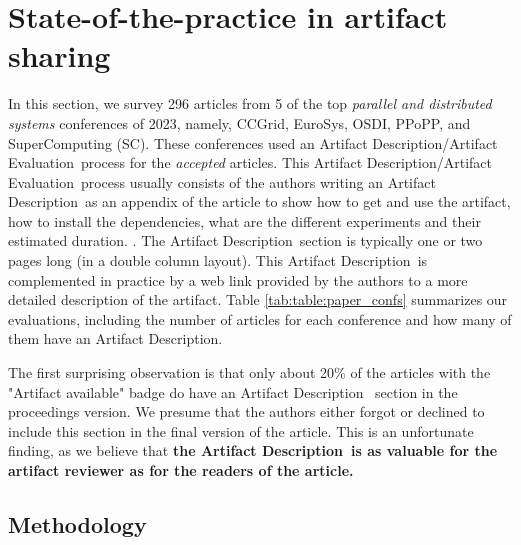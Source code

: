 \documentclass[sigconf,natbib=false]{acmart}
\newcommand{\ad}{Artifact Description}
\newcommand{\aeval}{Artifact Evaluation}
\newcommand{\adae}{\ad/\aeval}
\newcommand{\todo}[1]{{\color{red}{TODO: #1}}}
\begin{document}
%
\section{State-of-the-practice in artifact sharing}\label{sec:sop}



In this section, we survey 296 articles from 5 of the top \emph{parallel and distributed systems} conferences of 2023, namely, CCGrid, EuroSys, OSDI, PPoPP, and SuperComputing (SC).
These conferences used an \adae\ process for the \emph{accepted} articles.
This \adae\ process usually consists of the authors writing an \ad\ as an appendix of the article to show how to get and use the artifact, how to install the dependencies, what are the different experiments and their estimated duration. \cite{ae_tip, creating_successful_artifacts, ae_guidelines}.
The \ad\ section is typically one or two pages long (in a double column layout).
This \ad\ is complemented in practice by a web link provided by the authors to a more detailed description of the artifact.
Table \ref{tab:table:paper_confs} summarizes our evaluations, including the number of articles for each conference and how many of them have an \ad.


The first surprising observation is that only about 20\% of the articles with the "Artifact available" badge do have an \ad~ section in the proceedings version.
We presume that the authors either forgot or declined to include this section in the final version of the article.
This is an unfortunate finding, as we believe that \textbf{the \ad\ is as valuable for the artifact reviewer as for the readers of the article.}

\subsection{Methodology}
\end{document}
